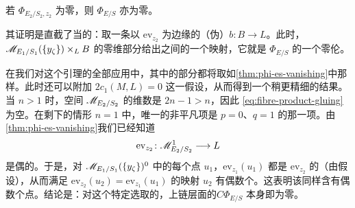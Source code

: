 \begin{lemma}\label{thm:fibre-product-vanishing}
若 $\Phi_{E_2/S_2,z_2}$ 为零，则 $\Phi_{E/S}$ 亦为零。
\end{lemma}
\endgroup
其证明是直截了当的：取一条以 $\mathrm{ev}_{z_2}$ 为边缘的（伪）\trCycle{}$b\colon B\to L$。此时，$\mathscr{M}_{E_1/S_1}(\{y_\zeta\})\times_L B$ 的零维部分给出\trFloerCochainGroup{}之间的一个映射，它就是 $\Phi_{E/S}$ 的一个零伦。
\begin{remark}\label{thm:cochain-level-vanishing}
在我们对这个引理的全部应用中，其中的\trCompact{}部分都将取如\cref{thm:phi-es-vanishing}中那样。此时还可以附加 $2c_1(M,L)=0$ 这一假设，从而得到一个稍更精细的结果。当 $n>1$ 时，空间 $\mathscr{M}_{E_2/S_2}$ 的维数是 $2n-1>n$，因此\trFibreProduct{} \eqref{eq:fibre-product-gluing} 为空。在剩下的情形 $n=1$ 中，唯一的非平凡项是 $p=0$、$q=1$ 的那一项。由\cref{thm:phi-es-vanishing}我们已经知道\trEvaluationMap
\begin{equation*}
\mathrm{ev}_{z_2}\colon\mathscr{M}_{E_2/S_2}^1\longrightarrow L
\end{equation*}
是偶\trDegree{}的。于是，对 $\mathscr{M}_{E_1/S_1}(\{y_\zeta\})^0$ 中的每个\trIsolated{}点 $u_1$，$\mathrm{ev}_{z_1}(u_1)$ 都是 $\mathrm{ev}_{z_2}$ 的\trRegularValue（由\trTransversality{}假设），从而满足 $\mathrm{ev}_{z_2}(u_2)=\mathrm{ev}_{z_1}(u_1)$ 的映射 $u_2$ 有偶数个。这表明该\trFibreProduct{}同样含有偶数个点。结论是：对这个特定选取的\trPerturbationDatum，上链层面的\trInvariant{}$C\Phi_{E/S}$ 本身即为零。
\end{remark}
